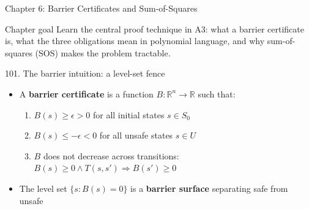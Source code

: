 \documentclass[aspectratio=169]{beamer}
\begin{document}

\begin{frame}{Chapter 6: Barrier Certificates and Sum-of-Squares}
\begin{block}{Chapter goal}
Learn the central proof technique in A3: what a barrier certificate is, what the three obligations
mean in polynomial language, and why sum-of-squares (SOS) makes the problem tractable.
\end{block}
\end{frame}

\begin{frame}{101. The barrier intuition: a level-set fence}
\begin{itemize}
  \item A \textbf{barrier certificate} is a function \(B: \mathbb{R}^n \to \mathbb{R}\) such that:
  \begin{enumerate}
    \item \(B(s) \ge \epsilon > 0\) for all initial states \(s \in S_0\)
    \item \(B(s) \le -\epsilon < 0\) for all unsafe states \(s \in U\)
    \item \(B\) does not decrease across transitions: \(B(s) \ge 0 \wedge T(s,s') \Rightarrow B(s') \ge 0\)
  \end{enumerate}
  \item The level set \(\{s : B(s) = 0\}\) is a \textbf{barrier surface} separating safe from unsafe
\end{itemize}
\begin{center}
\end{center}
\end{frame}
\end{document}

